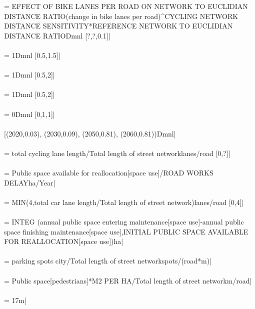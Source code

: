  = EFFECT OF BIKE LANES PER ROAD ON NETWORK TO EUCLIDIAN DISTANCE RATIO(change in bike lanes per road)\^{}CYCLING NETWORK DISTANCE SENSITIVITY*REFERENCE NETWORK TO EUCLIDIAN DISTANCE RATIODmnl [?,?,0.1]| \\ \\ 
 = 1Dmnl [0.5,1.5]| \\ \\ 
 = 1Dmnl [0.5,2]| \\ \\ 
 = 1Dmnl [0.5,2]| \\ \\ 
 = 0Dmnl [0,1,1]| \\ \\ 
 [(2020,0.03), (2030,0.09), (2050,0.81), (2060,0.81))Dmnl| \\ \\ 
 = total cycling lane length/Total length of street networklanes/road [0,?]| \\ \\ 
 = Public space available for reallocation[space use]/ROAD WORKS DELAYha/Year| \\ \\ 
 = MIN(4,total car lane length/Total length of street network)lanes/road [0,4]| \\ \\ 
 =  INTEG (annual public space entering maintenance[space use]-annual public space finishing maintenance[space use],INITIAL PUBLIC SPACE AVAILABLE FOR REALLOCATION[space use])ha| \\ \\ 
 = parking spots city/Total length of street networkspots/(road*m)| \\ \\ 
 = Public space[pedestrians]*M2 PER HA/Total length of street networkm/road| \\ \\ 
 = 17m| \\ \\ 
